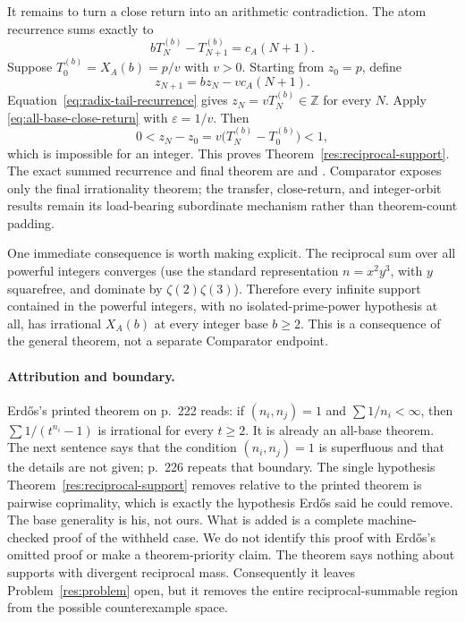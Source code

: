 \documentclass[11pt]{article}
\begin{document}
It remains to turn a close return into an arithmetic contradiction.  The atom
recurrence sums exactly to
\[
 bT_N^{(b)}-T_{N+1}^{(b)}=c_A(N+1).
 \tag{9}\label{eq:radix-tail-recurrence}
\]
Suppose \(T_0^{(b)}=X_A(b)=p/v\) with \(v>0\).  Starting from \(z_0=p\), define
\[
 z_{N+1}=bz_N-vc_A(N+1).
\]
Equation~\eqref{eq:radix-tail-recurrence} gives
\(z_N=vT_N^{(b)}\in\mathbb Z\) for every \(N\).  Apply
\eqref{eq:all-base-close-return} with \(\varepsilon=1/v\).  Then
\[
 0<z_N-z_0=v\bigl(T_N^{(b)}-T_0^{(b)}\bigr)<1,
\]
which is impossible for an integer.  This proves
Theorem~\ref{res:reciprocal-support}.  The exact summed recurrence and final
theorem are
and
.
Comparator exposes only the final irrationality theorem; the transfer,
close-return, and integer-orbit results remain its load-bearing subordinate
mechanism rather than theorem-count padding.

One immediate consequence is worth making explicit.  The reciprocal sum over
all powerful integers converges (use the standard representation
\(n=x^2y^3\), with \(y\) squarefree, and dominate by
\(\zeta(2)\zeta(3)\)).  Therefore every infinite support contained in the
powerful integers, with no isolated-prime-power hypothesis at all, has
irrational \(X_A(b)\) at every integer base \(b\ge2\).  This is a consequence
of the general theorem, not a separate Comparator endpoint.

\paragraph{Attribution and boundary.}\label{bdry:reciprocal-support}
Erd\H{o}s's printed theorem on p.~222 reads: if \((n_i,n_j)=1\) and
\(\sum1/n_i<\infty\), then \(\sum1/(t^{n_i}-1)\) is irrational for every
\(t\ge2\).  It is already an all-base theorem.  The next sentence says that
the condition \((n_i,n_j)=1\) is superfluous and that the details are not
given; p.~226 repeats that boundary.  The single hypothesis
Theorem~\ref{res:reciprocal-support} removes relative to the printed theorem
is pairwise coprimality, which is exactly the hypothesis Erd\H{o}s said he
could remove.  The base generality is his, not ours.  What is added is a
complete machine-checked proof of the withheld case.  We do not identify this
proof with Erd\H{o}s's omitted proof or make a theorem-priority claim.
The theorem says nothing about supports with divergent reciprocal mass.
Consequently it leaves Problem~\ref{res:problem} open, but it removes the
entire reciprocal-summable region from the possible counterexample space.
\end{document}
